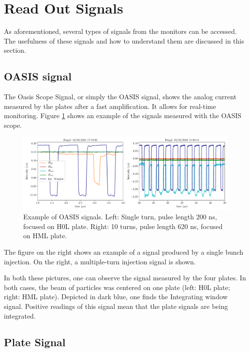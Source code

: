 \section{Read Out Signals}

As aforementioned, several types of signals from the monitors can be accessed. The usefulness of these signals and how to understand them are discussed in this section. 

\subsection{OASIS signal}
\label{sec:OasisSignal}

The Oasis Scope Signal, or simply the OASIS signal, shows the analog current measured by the plates after a fast amplification. It allows for real-time monitoring. Figure \ref{fig:OasisSignal} shows an example of the signals measured with the OASIS scope. 

\begin{figure}[h]
    \centering
    \includegraphics[width=1.0\columnwidth]{Figure_OasisSignals/OasisSignal.pdf}
    \caption{Example of OASIS signals. Left: Single turn, pulse length 200 ns, focused on H0L plate. Right: 10 turns, pulse length 620 ns, focused on HML plate. }
    \label{fig:OasisSignal}
\end{figure}

The figure on the right shows an example of a signal produced by a single bunch injection. On the right, a multiple-turn injection signal is shown. 

In both these pictures, one can observe the signal measured by the four plates. In both cases, the beam of particles was centered on one plate (left: H0L plate; right: HML plate). Depicted in dark blue, one finds the Integrating window signal. Positive readings of this signal mean that the plate signals are being integrated.



\subsection{Plate Signal}

